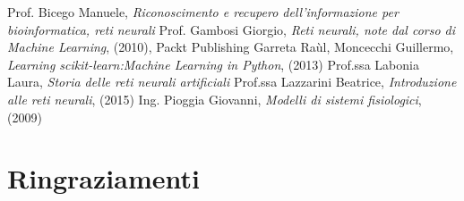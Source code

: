 \documentclass[12pt,a4paper,oneside]{book}
\begin{document}
\begin{thebibliography}{9} 
	 Prof. Bicego Manuele, \emph{Riconoscimento e recupero dell’informazione per bioinformatica, reti neurali}
	 Prof. Gambosi Giorgio, \emph{Reti neurali, note dal corso di Machine Learning}, (2010), Packt Publishing 
	 Garreta Raùl, Moncecchi Guillermo, \emph{Learning scikit-learn:Machine Learning in Python}, (2013) 
	 Prof.ssa Labonia Laura, \emph{Storia delle reti neurali artificiali}
	 Prof.ssa Lazzarini Beatrice, \emph{Introduzione alle reti neurali}, (2015)
	 Ing. Pioggia Giovanni, \emph{Modelli di sistemi fisiologici}, (2009)
 \end{thebibliography}
	
\chapter*{Ringraziamenti}
\end{document}
